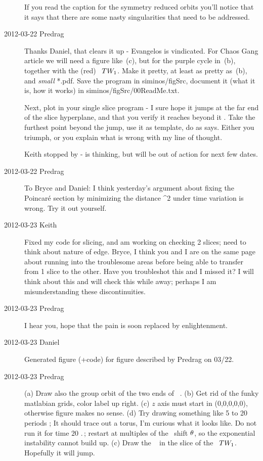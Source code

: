 \begin{description}
If you read the caption for the symmetry reduced orbits you'll notice
that it says that there are some nasty singularities that need to be
addressed.

\item[2012-03-22 Predrag~~] Thanks Daniel, that clears it up - Evangelos
is vindicated. For Chaos Gang article we will need a figure like
\,{(c)}, but for the purple cycle  in
\,{(b)}, together with the (red) \reqv\
$TW_{1}$. Make it pretty, at least as pretty as
\,{(b)}, and \emph{small} *.pdf. Save the
program in siminos/figSrc, document it (what it is, how it works) in
siminos/figSrc/00ReadMe.txt.

Next, plot   in your single slice program - I sure hope it
jumps at the far end of the slice hyperplane, and that you verify it
reaches beyond it \chartBord. Take the furthest point beyond the jump,
use it as template, do as \reffig{fig:A29-2slices} says. Either you
triumph, or you explain what is wrong with my line of thought.

Keith stopped by - is thinking, but will be out of action for next few
dates.

\item[2012-03-22 Predrag~~] To Bryce and Daniel: I think yesterday's
argument about fixing the Poincar\'e section by  minimizing the distance
\beq
\Norm{\ssp(\zeit) - \slicep)}^2
under time variation is wrong.  Try it out yourself.

\item[2012-03-23 Keith~~] Fixed my code for slicing, and am working on
checking 2 slices; need to think about nature of edge.  Bryce, I think
you and I are on the same page about running into the troublesome areas
before being able to transfer from 1 slice to the other.  Have you
troubleshot this and I missed it?  I will think about this and will check
this while away; perhaps I am misunderstanding these discontinuities.

\item[2012-03-23 Predrag~~] I hear you, hope that the pain is soon replaced by
enlightenment.


\item[2012-03-23 Daniel~~]
Generated figure (+code) for figure described by Predrag on 03/22.

\item[2012-03-23 Predrag~~]
(a) Draw also the group orbit of the two ends of \rpo\ .
(b) Get rid of the funky matlabian grids, color label up right.
(c) $z$ axis must start in (0,0,0,0,0), otherwise figure makes no sense.
(d) Try drawing something like 5 to 20 periods \period{}; It should trace
out a torus, I'm curious what it looks like. Do not run it for time
$20\,\period{}$; restart at multiples of the \rpo\ shift $\theta$, so
the exponential instability cannot build up.
(c) Draw the \po\  in the slice of the \eqv\ $TW_{1}$.
Hopefully it will jump.


\end{description}
